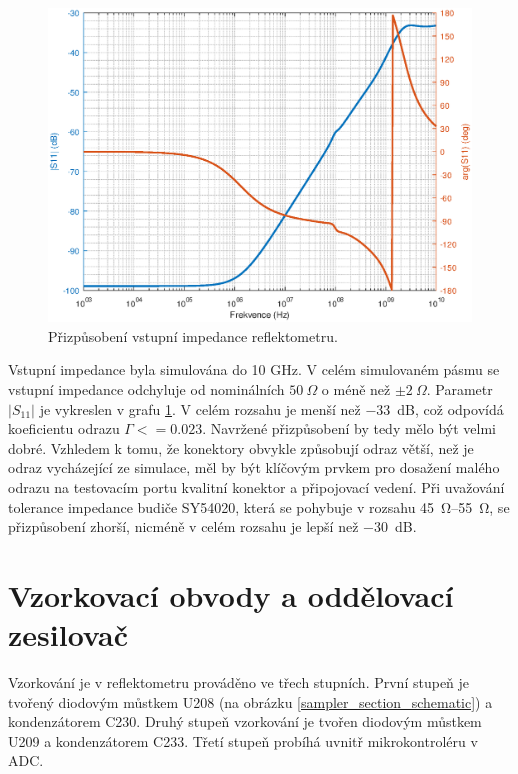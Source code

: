 \begin{figure}[htbp]
\includegraphics[width=\textwidth,keepaspectratio]{images/input_reflection.eps}\caption{Přizpůsobení vstupní impedance reflektometru.}\label{input_reflection}
\end{figure}

Vstupní impedance byla simulována do 10 GHz. V celém simulovaném pásmu se vstupní impedance odchyluje od nominálních $50~\Omega$ o méně než $\pm2~\Omega$. Parametr $\lvert S_\mathrm{11} \rvert$ je vykreslen v grafu \ref{input_reflection}. V celém rozsahu je menší než \SI{-33}{\deci\bel}, což odpovídá koeficientu odrazu $\Gamma <= 0.023$. Navržené přizpůsobení by tedy mělo být velmi dobré. Vzhledem k tomu, že konektory obvykle způsobují odraz větší, než je odraz vycházející ze simulace, měl by být klíčovým prvkem pro dosažení malého odrazu na testovacím portu kvalitní konektor a připojovací vedení. Při uvažování tolerance impedance budiče SY54020, která se pohybuje v rozsahu \SIrange{45}{55}{\ohm}, se přizpůsobení zhorší, nicméně v celém rozsahu je lepší než \SI{-30}{\deci\bel}.

\section{Vzorkovací obvody a oddělovací zesilovač}
Vzorkování je v reflektometru prováděno ve třech stupních. První stupeň je tvořený diodovým můstkem U208 (na obrázku \ref{sampler_section_schematic}) a kondenzátorem C230. Druhý stupeň vzorkování je tvořen diodovým můstkem U209 a kondenzátorem C233. Třetí stupeň probíhá uvnitř mikrokontroléru v \acrshort{ADC}.

